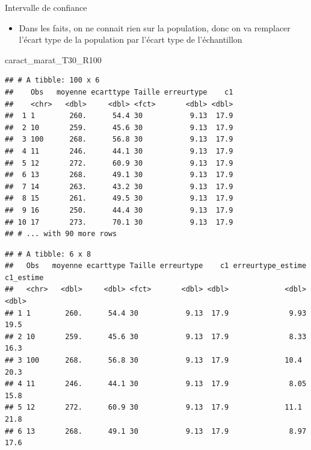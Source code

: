 \documentclass[ignorenonframetext,]{beamer}
\newenvironment{Shaded}{\begin{snugshade}}{\end{snugshade}}
\newcommand{\KeywordTok}[1]{\textcolor[rgb]{0.13,0.29,0.53}{\textbf{#1}}}
\newcommand{\DataTypeTok}[1]{\textcolor[rgb]{0.13,0.29,0.53}{#1}}
\newcommand{\DecValTok}[1]{\textcolor[rgb]{0.00,0.00,0.81}{#1}}
\newcommand{\FloatTok}[1]{\textcolor[rgb]{0.00,0.00,0.81}{#1}}
\newcommand{\StringTok}[1]{\textcolor[rgb]{0.31,0.60,0.02}{#1}}
\newcommand{\OperatorTok}[1]{\textcolor[rgb]{0.81,0.36,0.00}{\textbf{#1}}}
\newcommand{\NormalTok}[1]{#1}
\providecommand{\tightlist}{%
  \setlength{\itemsep}{0pt}\setlength{\parskip}{0pt}}
\begin{document}
\begin{frame}[fragile]{Intervalle de confiance}

\begin{itemize}
\tightlist
\item
  Dans les faits, on ne connait rien sur la population, donc on va
  remplacer l'écart type de la population par l'écart type de
  l'échantillon
\end{itemize}

\begin{Shaded}
\begin{Highlighting}[]
\NormalTok{caract_marat_T30_R100}
\end{Highlighting}
\end{Shaded}

\begin{verbatim}
## # A tibble: 100 x 6
##    Obs   moyenne ecarttype Taille erreurtype    c1
##    <chr>   <dbl>     <dbl> <fct>       <dbl> <dbl>
##  1 1        260.      54.4 30           9.13  17.9
##  2 10       259.      45.6 30           9.13  17.9
##  3 100      268.      56.8 30           9.13  17.9
##  4 11       246.      44.1 30           9.13  17.9
##  5 12       272.      60.9 30           9.13  17.9
##  6 13       268.      49.1 30           9.13  17.9
##  7 14       263.      43.2 30           9.13  17.9
##  8 15       261.      49.5 30           9.13  17.9
##  9 16       250.      44.4 30           9.13  17.9
## 10 17       273.      70.1 30           9.13  17.9
## # ... with 90 more rows
\end{verbatim}

\begin{Shaded}
\end{Shaded}

\begin{verbatim}
## # A tibble: 6 x 8
##   Obs   moyenne ecarttype Taille erreurtype    c1 erreurtype_estime c1_estime
##   <chr>   <dbl>     <dbl> <fct>       <dbl> <dbl>             <dbl>     <dbl>
## 1 1        260.      54.4 30           9.13  17.9              9.93      19.5
## 2 10       259.      45.6 30           9.13  17.9              8.33      16.3
## 3 100      268.      56.8 30           9.13  17.9             10.4       20.3
## 4 11       246.      44.1 30           9.13  17.9              8.05      15.8
## 5 12       272.      60.9 30           9.13  17.9             11.1       21.8
## 6 13       268.      49.1 30           9.13  17.9              8.97      17.6
\end{verbatim}

\end{frame}
\end{document}
